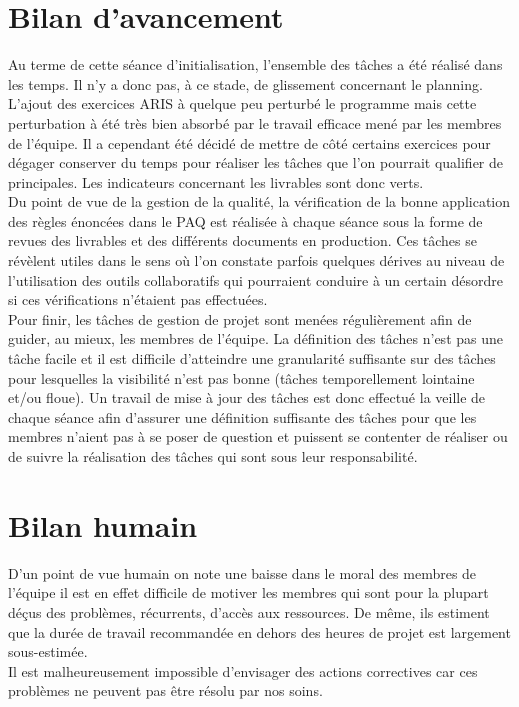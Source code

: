 
\section{Bilan d'avancement}

Au terme de cette séance d'initialisation, l'ensemble des tâches a été réalisé dans les temps. Il n'y a donc pas, à ce stade, de glissement concernant le planning. L'ajout des exercices ARIS à quelque peu perturbé le programme mais cette perturbation à été très bien absorbé par le travail efficace mené par les membres de l'équipe. Il a cependant été décidé de mettre de côté certains exercices pour dégager conserver du temps pour réaliser les tâches que l'on pourrait qualifier de principales. Les indicateurs concernant les livrables sont donc verts. \\

Du point de vue de la gestion de la qualité, la vérification de la bonne application des règles énoncées dans le PAQ est réalisée à chaque séance sous la forme de revues des livrables et des différents documents en production. Ces tâches se révèlent utiles dans le sens où l'on constate parfois quelques dérives au niveau de l'utilisation des outils collaboratifs qui pourraient conduire à un certain désordre si ces vérifications n'étaient pas effectuées. \\

Pour finir, les tâches de gestion de projet sont menées régulièrement afin de guider, au mieux, les membres de l'équipe. La définition des tâches n'est pas une tâche facile et il est difficile d'atteindre une granularité suffisante sur des tâches pour lesquelles la visibilité n'est pas bonne (tâches temporellement lointaine et/ou floue). Un travail de mise à jour des tâches est donc effectué la veille de chaque séance afin d'assurer une définition suffisante des tâches pour que les membres n'aient pas à se poser de question et puissent se contenter de réaliser ou de suivre la réalisation des tâches qui sont sous leur responsabilité. \\

\section{Bilan humain}

D'un point de vue humain on note une baisse dans le moral des membres de l'équipe il est en effet difficile de motiver les membres qui sont pour la plupart déçus des problèmes, récurrents, d'accès aux ressources. De même, ils estiment que la durée de travail recommandée en dehors des heures de projet est largement sous-estimée. \\
Il est malheureusement impossible d'envisager des actions correctives car ces problèmes ne peuvent pas être résolu par nos soins.
